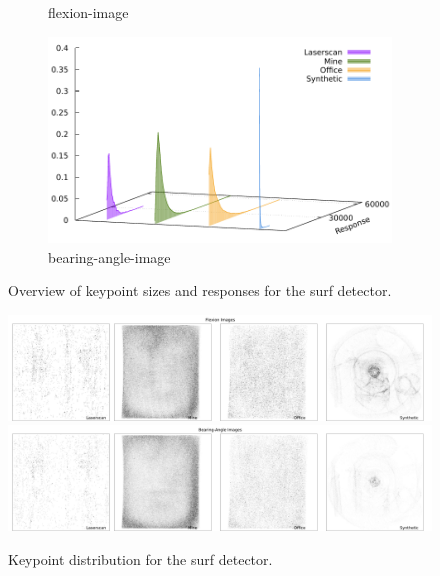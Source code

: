 \begin{figure}[H]
\begin{subfigure}[t]{0.45\linewidth}
    \caption{\gls{flexion-image}}
\end{subfigure}\quad
\begin{subfigure}[t]{0.45\linewidth}
    \includegraphics[width=\linewidth]{chapter06/results/SURF/bearing/response.pdf}
    \caption{\gls{bearing-angle-image}}
\end{subfigure}
    \caption{Overview of keypoint sizes and responses for the \acrshort{surf} detector.}
\end{figure}
\begin{figure}[H]
    \includegraphics[width=\linewidth]{chapter06/results/SURF/flexion/distribution.pdf}\\
    \includegraphics[width=\linewidth]{chapter06/results/SURF/bearing/distribution.pdf}%
    \caption{Keypoint distribution for the \acrshort{surf} detector.}
\end{figure}
